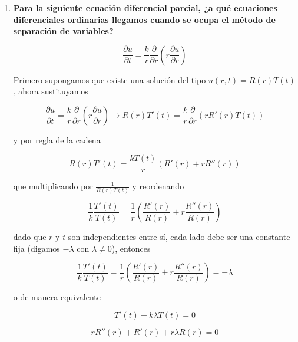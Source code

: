 \documentclass[12pt,a4paper]{article}
\begin{document}
\begin{enumerate}
    
    



    \item \textbf{Para la siguiente ecuación diferencial parcial, ¿a qué ecuaciones diferenciales ordinarias llegamos cuando se ocupa el método de separación de variables?}
    
    \begin{equation*}
        \frac{\partial u}{\partial t} = \frac{k}{r}\frac{\partial}{\partial r}\left(r \frac{\partial u}{\partial r}\right)
    \end{equation*}
    
    Primero supongamos que existe una solución del tipo $u(r,t) = R(r)T(t)$, ahora sustituyamos
    
    \begin{equation*}
        \frac{\partial u}{\partial t} = \frac{k}{r}\frac{\partial}{\partial r}\left(r \frac{\partial u}{\partial r}\right) \rightarrow R(r)T'(t) = \frac{k}{r} \frac{\partial}{\partial r} (r R'(r)T(t))
    \end{equation*}
    
    y por regla de la cadena
    
    \begin{equation*}
        R(r)T'(t)= \frac{k T(t)}{r}(R'(r)+ rR''(r))
    \end{equation*}
    
    que multiplicando por $\frac{1}{R(r)T(t)}$ y reordenando
    
    \begin{equation*}
        \frac{1}{k} \frac{T'(t)}{T(t)} = \frac{1}{r} (\frac{R'(r)}{R(r)} + r\frac{R''(r)}{R(r)}) 
    \end{equation*}
    
    dado que $r$ y $t$ son independientes entre sí, cada lado debe ser una constante fija (digamos $-\lambda$ con $\lambda \neq 0$), entonces
    
    \begin{equation*}
        \frac{1}{k} \frac{T'(t)}{T(t)} = \frac{1}{r} (\frac{R'(r)}{R(r)} + r\frac{R''(r)}{R(r)}) = -\lambda
    \end{equation*}
    
    o de manera equivalente
    
    \begin{equation*}
        T'(t)+k\lambda T(t) = 0
    \end{equation*}
    
    \begin{equation*}
        rR''(r) + R'(r) + r\lambda R(r) = 0
    \end{equation*}
    

\end{enumerate}
\end{document}
